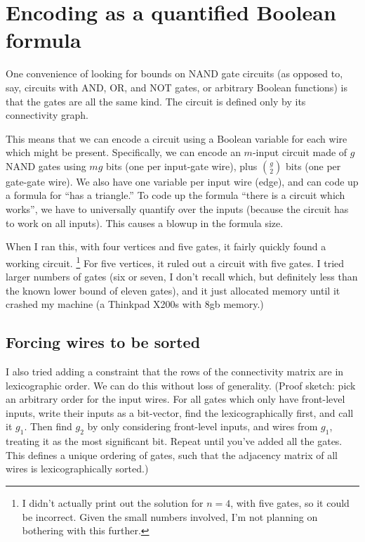 \documentclass[12pt]{article}
\begin{document}
\section{Encoding as a quantified Boolean formula}

One convenience of looking for bounds on NAND gate circuits
(as opposed to, say, circuits with AND, OR, and NOT gates,
or arbitrary Boolean functions) is that the gates are all
the same kind. The circuit is defined only by its
connectivity graph.

This means that we can encode a circuit
using a Boolean variable for each wire which might be
present. Specifically, we can encode an $m$-input circuit
made of $g$ NAND gates using $mg$ bits (one per input-gate
wire), plus $g \choose 2$ bits (one per gate-gate wire).
We also have one variable per input wire (edge), and can code up
a formula for ``has a triangle.''
To code up the formula ``there is a circuit which works'', we
have to universally quantify over the inputs (because the
circuit has to work on all inputs). This causes a
blowup in the formula size.

When I ran this, with four vertices and five gates, it
fairly quickly found a working circuit. 
\footnote{I didn't actually print out the solution for $n=4$, with
five gates, so it could be incorrect. Given the small numbers
involved, I'm not planning on bothering with this further.}
For five vertices, it ruled out a circuit with five gates.
I tried larger numbers of gates (six or seven, I don't recall
which, but definitely less than the known lower bound of eleven
gates), and it just allocated memory until it crashed
my machine (a Thinkpad X200s with 8gb memory.)

\subsection{Forcing wires to be sorted}

I also tried adding a constraint that the rows of
the connectivity matrix are in lexicographic order.
We can do this without loss of generality. (Proof sketch:
pick an arbitrary order for the input wires. For all gates
which only have front-level inputs, write their inputs as
a bit-vector, find the lexicographically first, and call it
$g_1$. Then find $g_2$ by only considering front-level inputs,
and wires from $g_1$, treating it as the most significant bit.
Repeat until you've added all the gates.
This defines a unique ordering of gates, such that the adjacency
matrix of all wires is lexicographically sorted.)
\end{document}
